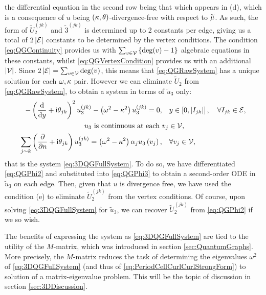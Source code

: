 the differential equation in the second row being that which appears in (d), which is a consequence of $u$ being $\left( \kappa, \theta \right)$-divergence-free with respect to $\widetilde{\mu}$.
As such, the form of $\widetilde{U}_2^{(jk)}$ and $\widetilde{3}^{(jk)}$ is determined up to 2 constants per edge, giving us a total of $2\left\lvert \mathcal{E} \right\rvert$ constants to be determined by the vertex conditions.
The condition \eqref{eq:QGContinuity} provides us with $\sum_{v\in\mathcal{V}}\left\{ \mathrm{deg}(v)-1 \right\}$ algebraic equations in these constants, whilst \eqref{eq:QGVertexCondition} provides us with an additional $\left\lvert \mathcal{V} \right\rvert$.
Since $2\left\lvert \mathcal{E} \right\rvert = \sum_{v\in\mathcal{V}}\mathrm{deg}(v)$, this means that \eqref{eq:QGRawSystem} has a unique solution for each $\omega, \kappa$ pair.
However we can eliminate $\widetilde{U}_2$ from \eqref{eq:QGRawSystem}, to obtain a system in terms of $\widetilde{u}_3$ only:
\begin{align*}
	- \left(  \dfrac{\mathrm{d}}{\mathrm{d}y} + \mathrm{i}\theta_{jk}  \right)^2 u_3^{(jk)} - \left( \omega^2-\kappa^2 \right)u_3^{(jk)} = 0, &\quad y\in\left[ 0,\left\lvert I_{jk} \right\rvert \right], \quad\forall I_{jk}\in\mathcal{E}, \\
	u_3 \text{ is continuous at each } & v_j\in\mathcal{V}, \\
	\sum_{j\sim k}\left(  \dfrac{\partial }{\partial n} + \mathrm{i}\theta_{jk}  \right)u_3^{(jk)} = \left( \omega^2-\kappa^2 \right)\alpha_j u_3\left( v_j \right), &\quad\forall v_j\in\mathcal{V},
\end{align*}
that is the system \eqref{eq:3DQGFullSystem}.
To do so, we have differentiated \eqref{eq:QGPhi2} and substituted into \eqref{eq:QGPhi3} to obtain a second-order ODE in $\widetilde{u}_3$ on each edge.
Then, given that $u$ is divergence free, we have used the condition (e) to eliminate $\widetilde{U}_2^{(jk)}$ from the vertex conditions.
Of course, upon solving \eqref{eq:3DQGFullSystem} for $\widetilde{u}_3$, we can recover $\widetilde{U}_2^{(jk)}$ from \eqref{eq:QGPhi2} if we so wish.

The benefits of expressing the system as \eqref{eq:3DQGFullSystem} are tied to the utility of the $M$-matrix, which was introduced in section \ref{sec:QuantumGraphs}.
More precisely, the $M$-matrix reduces the task of determining the eigenvalues $\omega^2$ of \eqref{eq:3DQGFullSystem} (and thus of \eqref{eq:PeriodCellCurlCurlStrongForm}) to solution of a matrix-eigenvalue problem.
This will be the topic of discussion in section \ref{sec:3DDiscussion}.